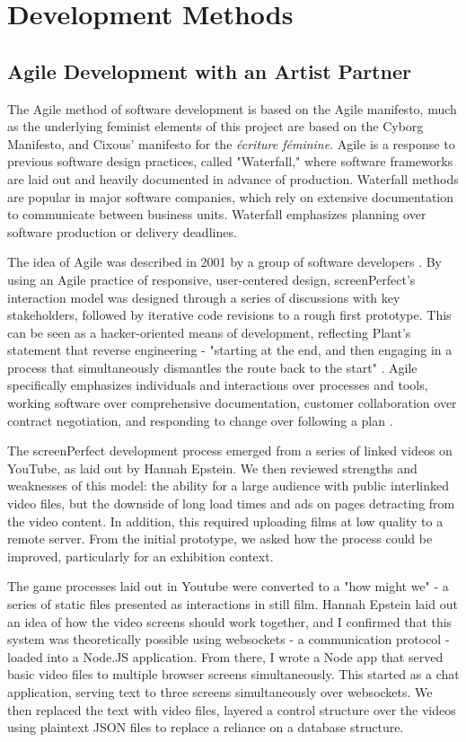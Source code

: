 \section{Development Methods}
\subsection{ Agile Development with an Artist Partner}
The Agile method of software development is based on the Agile manifesto, much as the underlying feminist elements of this project are based on the Cyborg Manifesto, and Cixous' manifesto for the \textit{\'{e}criture f\'{e}minine}. Agile is a response to previous software design practices, called "Waterfall," where software frameworks are laid out and heavily documented in advance of production. Waterfall methods are popular in major software companies, which rely on extensive documentation to communicate between business units. Waterfall emphasizes planning over software production or delivery deadlines. 

The idea of Agile was described in 2001 by a group of software developers \parencite{Agile}. By using an Agile practice of responsive, user-centered design, screenPerfect's interaction model was designed through a series of discussions with key stakeholders, followed by iterative code revisions to a rough first prototype. This can be seen as a hacker-oriented means of development, reflecting Plant's statement that reverse engineering - "starting at the end, and then engaging in a process that simultaneously dismantles the route back to the start" \parencite{plant}. Agile specifically emphasizes individuals and interactions over processes and tools, working software over comprehensive documentation, customer collaboration over contract negotiation, and responding to change over following a plan \parencite{Agile}. 

The screenPerfect development process emerged from a series of linked videos on YouTube, as laid out by Hannah Epstein. We then reviewed strengths and weaknesses of this model: the ability for a large audience with public interlinked video files, but the downside of long load times and ads on pages detracting from the video content. In addition, this required uploading films at low quality to a remote server. From the initial prototype, we asked how the process could be improved, particularly for an exhibition context. 

The game processes laid out in Youtube were converted to a "how might we" - a series of static files presented as interactions in still film. Hannah Epstein laid out an idea of how the video screens should work together, and I confirmed that this system was theoretically possible using websockets - a communication protocol - loaded into a Node.JS application. From there, I wrote a Node app that served basic video files to multiple browser screens simultaneously. This started as a chat application, serving text to three screens simultaneously over websockets. We then replaced the text with video files, layered a control structure over the videos using plaintext JSON files to replace a reliance on a database structure.

